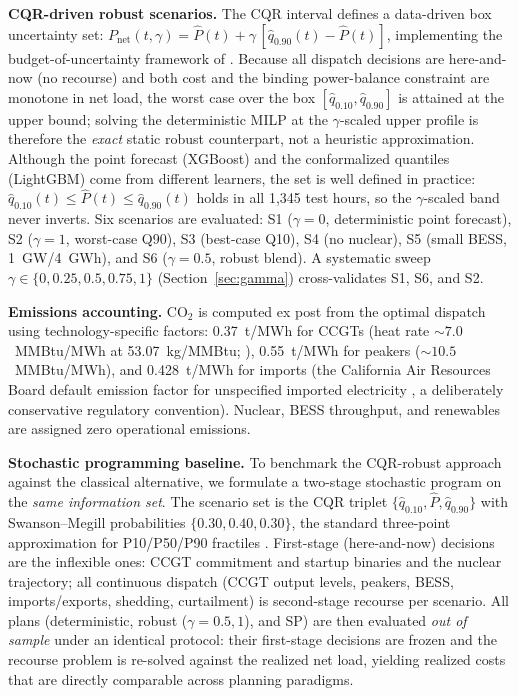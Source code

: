 \documentclass[preprint,12pt,authoryear]{elsarticle}
\begin{document}
\textbf{CQR-driven robust scenarios.} The CQR interval defines a data-driven box uncertainty set: $P_{\text{net}}(t,\gamma) = \hat{P}(t) + \gamma\,[\hat{q}_{0.90}(t) - \hat{P}(t)]$, implementing the budget-of-uncertainty framework of \citet{bertsimas2004}. Because all dispatch decisions are here-and-now (no recourse) and both cost and the binding power-balance constraint are monotone in net load, the worst case over the box $[\hat{q}_{0.10}, \hat{q}_{0.90}]$ is attained at the upper bound; solving the deterministic MILP at the $\gamma$-scaled upper profile is therefore the \emph{exact} static robust counterpart, not a heuristic approximation. Although the point forecast (XGBoost) and the conformalized quantiles (LightGBM) come from different learners, the set is well defined in practice: $\hat{q}_{0.10}(t) \leq \hat{P}(t) \leq \hat{q}_{0.90}(t)$ holds in all 1{,}345 test hours, so the $\gamma$-scaled band never inverts. Six scenarios are evaluated: S1 ($\gamma{=}0$, deterministic point forecast), S2 ($\gamma{=}1$, worst-case Q90), S3 (best-case Q10), S4 (no nuclear), S5 (small BESS, 1~GW/4~GWh), and S6 ($\gamma{=}0.5$, robust blend). A systematic sweep $\gamma \in \{0, 0.25, 0.5, 0.75, 1\}$ (Section~\ref{sec:gamma}) cross-validates S1, S6, and S2.

\textbf{Emissions accounting.} CO$_2$ is computed ex post from the optimal dispatch using technology-specific factors: 0.37~t/MWh for CCGTs (heat rate ${\sim}7.0$~MMBtu/MWh at 53.07~kg/MMBtu; \citealp{epa2023}), 0.55~t/MWh for peakers (${\sim}10.5$~MMBtu/MWh), and 0.428~t/MWh for imports (the California Air Resources Board default emission factor for unspecified imported electricity \citep{carb2023}, a deliberately conservative regulatory convention). Nuclear, BESS throughput, and renewables are assigned zero operational emissions.

\textbf{Stochastic programming baseline.} To benchmark the CQR-robust approach against the classical alternative, we formulate a two-stage stochastic program on the \emph{same information set}. The scenario set is the CQR triplet $\{\hat{q}_{0.10}, \hat{P}, \hat{q}_{0.90}\}$ with Swanson--Megill probabilities $\{0.30, 0.40, 0.30\}$, the standard three-point approximation for P10/P50/P90 fractiles \citep{keefer1983}. First-stage (here-and-now) decisions are the inflexible ones: CCGT commitment and startup binaries and the nuclear trajectory; all continuous dispatch (CCGT output levels, peakers, BESS, imports/exports, shedding, curtailment) is second-stage recourse per scenario. All plans (deterministic, robust ($\gamma = 0.5, 1$), and SP) are then evaluated \emph{out of sample} under an identical protocol: their first-stage decisions are frozen and the recourse problem is re-solved against the realized net load, yielding realized costs that are directly comparable across planning paradigms.
\end{document}
